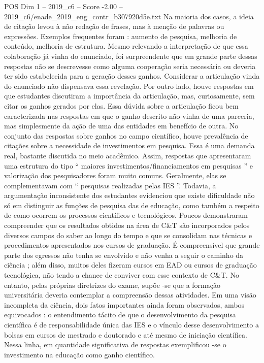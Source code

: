 \begin{textsample}{POS Dim 1 – 2019\_c6 – Score -2.00 – 2019\_c6/enade\_2019\_eng\_contr\_b307920d5e.txt}
Na maioria dos casos, a ideia de citação levou à não redação de frases, mas à menção de palavras ou expressões.
Exemplos frequentes foram : aumento de pesquisa, melhoria de conteúdo, melhoria de estrutura.
Mesmo relevando a interpretação de que essa colaboração já vinha do enunciado, foi surpreendente que em grande parte dessas respostas não se descrevesse como alguma cooperação seria necessária ou deveria ter sido estabelecida para a geração desses ganhos.
Considerar a articulação vinda do enunciado não dispensava essa revelação.
Por outro lado, houve respostas em que estudantes discutiram a importância da articulação, mas, curiosamente, sem citar os ganhos gerados por elas.
Essa dúvida sobre a articulação ficou bem caracterizada nas respostas em que o ganho descrito não vinha de uma parceria, mas simplesmente da ação de uma das entidades em benefício de outra.
No conjunto das respostas sobre ganhos no campo científico, houve prevalência de citações sobre a necessidade de investimentos em pesquisa.
Essa é uma demanda real, bastante discutida no meio acadêmico.
Assim, respostas que apresentaram uma estrutura do tipo “ maiores investimentos/financiamentos em pesquisas ” e valorização dos pesquisadores foram muito comuns.
Geralmente, elas se complementavam com “ pesquisas realizadas pelas IES ”.
Todavia, a argumentação inconsistente dos estudantes evidenciou que existe dificuldade não só em distinguir as funções de pesquisa das de educação, como também a respeito de como ocorrem os processos científicos e tecnológicos.
Poucos demonstraram compreender que os resultados obtidos na área de C\&T são incorporados pelos diversos campos do saber ao longo do tempo e que se consolidam nas técnicas e procedimentos apresentados nos cursos de graduação.
É compreensível que grande parte dos egressos não tenha se envolvido e não venha a seguir o caminho da ciência ; além disso, muitos deles fizeram cursos em EAD ou cursos de graduação tecnológica, não tendo a chance de conviver com esse contexto de C\&T.
No entanto, pelas próprias diretrizes do exame, supõe -se que a formação universitária deveria contemplar a compreensão dessas atividades.
Em uma visão incompleta da ciência, dois fatos importantes ainda foram observados, ambos equivocados : o entendimento tácito de que o desenvolvimento da pesquisa científica é de responsabilidade única das IES e o vínculo desse desenvolvimento a bolsas em cursos de mestrado e doutorado e até mesmo de iniciação científica.
Nessa linha, em quantidade significativa de respostas exemplificou -se o investimento na educação como ganho científico.

\end{textsample}

